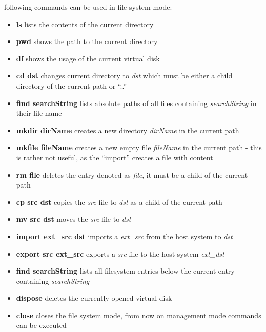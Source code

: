 following commands can be used in file system mode:

\begin{itemize}
  \item {\textbf{ls}} lists the contents of the current directory
  \item {\textbf{pwd}} shows the path to the current directory
  \item {\textbf{df}} shows the usage of the current virtual disk
  \item {\textbf{cd dst}} changes current directory to \textit{dst} which must
  be either a child directory of the current path or ``..''
  \item {\textbf{find searchString}} lists absolute paths of all files
  containing \textit{searchString} in their file name
  \item {\textbf{mkdir dirName}} creates a new directory \textit{dirName} in the
  current path
  \item {\textbf{mkfile fileName}} creates a new empty file \textit{fileName} in
  the current path - this is rather not useful, as the ``import'' creates a
  file with content
  \item {\textbf{rm file}} deletes the entry denoted as \textit{file}, it must
  be a child of the current path
  \item {\textbf{cp src dst}} copies the \textit{src} file to \textit{dst} as a
  child of the current path
  \item {\textbf{mv src dst}} moves the \textit{src} file to \textit{dst}
  \item {\textbf{import ext\_src dst}} imports a \textit{ext\_src} from the
  host system to \textit{dst}
  \item {\textbf{export src ext\_src}} exports a \textit{src} file to the host
  system \textit{ext\_dst}
  \item {\textbf{find searchString}} lists all filesystem entries below the
  current entry containing \textit{searchString}
  \item {\textbf{dispose}} deletes the currently opened virtual disk
  \item {\textbf{close}} closes the file system mode, from now on management mode
  commands can be executed
\end{itemize}